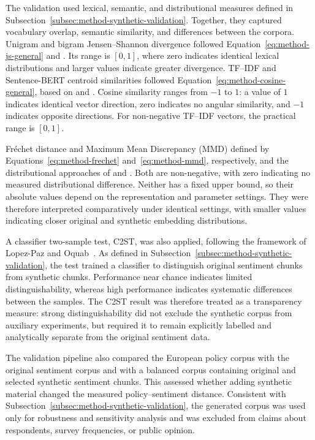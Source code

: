 The validation used lexical, semantic, and distributional measures defined in
Subsection~\ref{subsec:method-synthetic-validation}. Together, they captured
vocabulary overlap, semantic similarity, and differences between the corpora.
Unigram and bigram Jensen--Shannon divergence followed
Equation~\ref{eq:method-js-general} and \cite{endres2003new}. Its range is
$[0,1]$, where zero indicates identical lexical distributions and larger values
indicate greater divergence. TF--IDF and Sentence-BERT centroid similarities followed
Equation~\ref{eq:method-cosine-general}, based on \cite{salton1988term} and
\cite{reimers2019sentence}. Cosine similarity ranges from $-1$ to $1$: a value of
$1$ indicates identical vector direction, zero indicates no angular similarity, and
$-1$ indicates opposite directions. For non-negative TF--IDF vectors, the practical
range is $[0,1]$.

Fr\'echet distance and Maximum Mean Discrepancy (MMD) defined by
Equations~\ref{eq:method-frechet} and~\ref{eq:method-mmd}, respectively, and the
distributional approaches of \cite{heusel2017gans} and
\cite{gretton2012kernel}. Both are non-negative, with zero indicating no measured
distributional difference. Neither has a fixed upper bound, so their absolute values
depend on the representation and parameter settings. They were therefore interpreted
comparatively under identical settings, with smaller values indicating closer
original and synthetic embedding distributions.

A classifier two-sample test, C2ST, was also applied, following the
framework of Lopez-Paz and Oquab~\cite{lopez2016revisiting}. As defined in
Subsection~\ref{subsec:method-synthetic-validation}, the test trained a classifier to
distinguish original sentiment chunks from synthetic chunks. Performance near chance
indicates limited distinguishability, whereas high performance indicates systematic
differences between the samples. The C2ST result was therefore treated as a
transparency measure: strong distinguishability did not exclude the synthetic corpus
from auxiliary experiments, but required it to remain explicitly labelled and
analytically separate from the original sentiment data.

The validation pipeline also compared the European policy corpus with the original
sentiment corpus and with a balanced corpus containing original and selected
synthetic sentiment chunks. This assessed whether adding synthetic material changed
the measured policy--sentiment distance. Consistent with
Subsection~\ref{subsec:method-synthetic-validation}, the generated corpus was used
only for robustness and sensitivity analysis and was excluded from claims about
respondents, survey frequencies, or public opinion.

